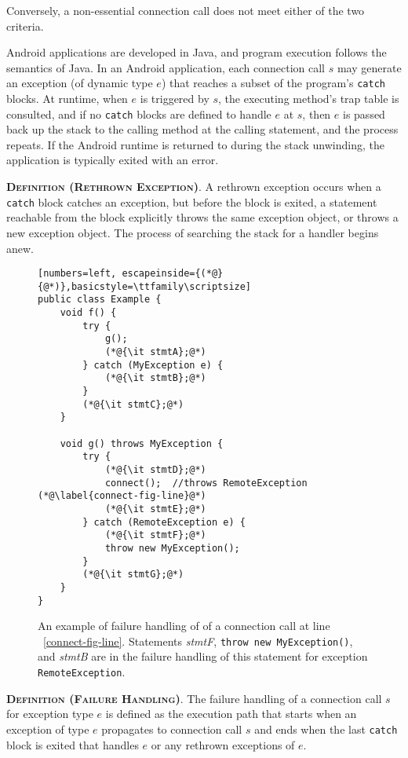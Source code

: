 \noindent Conversely, a non-essential connection call does not meet
either of the two criteria.  

Android applications are developed in Java, and program execution
follows the semantics of Java. In an Android application, each
connection call $s$ may generate an exception (of dynamic type $e$)
that reaches a subset of the program's \lstinline!catch! blocks.  At
runtime, when $e$ is triggered by $s$, the executing method's trap
table is consulted, and if no \lstinline!catch! blocks are defined to
handle $e$ at $s$, then $e$ is passed back up the stack to the
calling method at the calling statement, and the process repeats.  If
the Android runtime is returned to during the stack unwinding, the
application is typically exited with an error.  

\noindent\textsc{\bfseries{Definition (Rethrown Exception)}}.  A
rethrown exception occurs when a \lstinline!catch! block catches an
exception, but before the block is exited, a statement reachable from
the block explicitly throws the same exception object, or throws a new
exception object.  The process of searching the stack for a handler
begins anew.

\begin{figure}
\begin{lstlisting}[numbers=left, escapeinside={(*@}{@*)},basicstyle=\ttfamily\scriptsize]
public class Example {
    void f() {
        try {
            g();
            (*@{\it stmtA};@*)
        } catch (MyException e) {
            (*@{\it stmtB};@*)
        }
        (*@{\it stmtC};@*)
    }

    void g() throws MyException {
        try {
            (*@{\it stmtD};@*)
            connect();  //throws RemoteException (*@\label{connect-fig-line}@*)
            (*@{\it stmtE};@*)
        } catch (RemoteException e) {
            (*@{\it stmtF};@*)
            throw new MyException();            
        }        
        (*@{\it stmtG};@*)
    }
}
\end{lstlisting}
\caption{\label{fig:failure-handling}An example of failure handling of
  of a connection call at line ~\ref{connect-fig-line}.  Statements
  {\it stmtF}, \lstinline!throw new MyException()!, and {\it stmtB}
  are in the failure handling of this statement for exception \lstinline!RemoteException!.
}
\end{figure}

\noindent\textsc{\bfseries{Definition (Failure Handling)}}. The
failure handling of a connection call $s$ for exception type $e$ is
defined as the execution path that starts when an exception of type
$e$ propagates to connection call $s$ and ends when the last
\lstinline!catch! block is exited that handles $e$ or any rethrown
exceptions of $e$.

